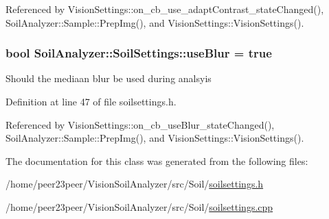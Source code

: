 Referenced by Vision\+Settings\+::on\+\_\+cb\+\_\+use\+\_\+adapt\+Contrast\+\_\+state\+Changed(), Soil\+Analyzer\+::\+Sample\+::\+Prep\+Img(), and Vision\+Settings\+::\+Vision\+Settings().

\hypertarget{class_soil_analyzer_1_1_soil_settings_a21bd246a48a712734af86f592030e18b}{}
\subsubsection[{use\+Blur}]{\setlength{\rightskip}{0pt plus 5cm}bool Soil\+Analyzer\+::\+Soil\+Settings\+::use\+Blur = true}\label{class_soil_analyzer_1_1_soil_settings_a21bd246a48a712734af86f592030e18b}
Should the mediaan blur be used during analsyis 

Definition at line 47 of file soilsettings.\+h.



Referenced by Vision\+Settings\+::on\+\_\+cb\+\_\+use\+Blur\+\_\+state\+Changed(), Soil\+Analyzer\+::\+Sample\+::\+Prep\+Img(), and Vision\+Settings\+::\+Vision\+Settings().



The documentation for this class was generated from the following files\+:\begin{DoxyCompactItemize}
\item 
/home/peer23peer/\+Vision\+Soil\+Analyzer/src/\+Soil/\hyperlink{soilsettings_8h}{soilsettings.\+h}\item 
/home/peer23peer/\+Vision\+Soil\+Analyzer/src/\+Soil/\hyperlink{soilsettings_8cpp}{soilsettings.\+cpp}\end{DoxyCompactItemize}
